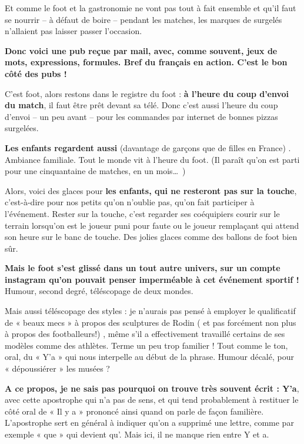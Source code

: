 \documentclass[11pt, french]{report}
\begin{document}
Et comme le foot et la gastronomie ne vont pas tout à fait ensemble et qu’il faut
se nourrir – à défaut de boire – pendant les matches, les marques de surgelés
n’allaient pas laisser passer l’occasion.

\textbf{Donc voici une pub reçue par mail, avec, comme souvent, jeux de mots, expressions,
  formules. Bref du français en action. C’est le bon côté des pubs !}

C’est foot, alors restons dans le registre du foot : \textbf{à l’heure du coup d’envoi du
  match}, il faut être prêt devant sa télé. Donc c’est aussi l’heure du coup
d’envoi – un peu avant – pour les commandes par internet de bonnes pizzas
surgelées.

\textbf{Les enfants regardent aussi} (davantage de garçons que de filles en France) .
Ambiance familiale. Tout le monde vit à l’heure du foot. (Il paraît qu’on est
parti pour une cinquantaine de matches, en un mois\ldots\ )

Alors, voici des glaces pour \textbf{les enfants, qui ne resteront pas sur la touche},
c’est-à-dire pour nos petits qu’on n’oublie pas, qu’on fait participer à
l’événement. Rester sur la touche, c’est regarder ses coéquipiers courir sur le
terrain lorsqu’on est le joueur puni pour faute ou le joueur remplaçant qui attend
son heure sur le banc de touche. Des jolies glaces comme des ballons de foot bien
sûr.

\textbf{Mais le foot s’est glissé dans un tout autre univers, sur un compte instagram
  qu’on pouvait penser imperméable à cet événement sportif !} Humour, second degré,
téléscopage de deux mondes.

Mais aussi téléscopage des styles : je n’aurais pas pensé à employer le
qualificatif de « beaux mecs » à propos des sculptures de Rodin ( et pas forcément
non plus à propos des footballeurs!) , même s’il a effectivement travaillé
certains de ses modèles comme des athlètes. Terme un peu trop familier ! Tout comme
le ton, oral, du « Y’a » qui nous interpelle au début de la phrase. Humour décalé,
pour « dépoussiérer » les musées ?

\textbf{A ce propos, je ne sais pas pourquoi on trouve très souvent écrit : Y’a},
avec cette apostrophe qui n’a pas de sens, et qui tend probablement à restituer le
côté oral de « Il y a » prononcé ainsi quand on parle de façon familière. L’apostrophe
sert en général à indiquer qu’on a supprimé une lettre, comme par exemple « que » qui
devient qu’. Mais ici, il ne manque rien entre Y et a.
\end{document}
